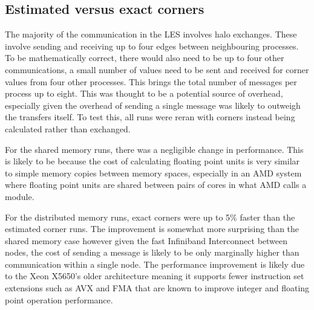 \subsection{Estimated versus exact corners}

The majority of the communication in the LES involves halo exchanges. These
involve sending and receiving up to four edges between neighbouring processes.
To be mathematically correct, there would also need to be up to four other
communications, a small number of values need to be sent and received for corner
values from four other processes. This brings the total number of messages per
process up to eight. This was thought to be a potential source of overhead,
especially given the overhead of sending a single message was likely to outweigh
the transfers itself. To test this, all runs were reran with corners instead
being calculated rather than exchanged.

For the shared memory runs, there was a negligible change in performance. This
is likely to be because the cost of calculating floating point units is very
similar to simple memory copies between memory spaces, especially in an AMD
system where floating point units are shared between pairs of cores in what AMD
calls a module.

For the distributed memory runs, exact corners were up to 5\% faster than the
estimated corner runs. The improvement is somewhat more surprising than the
shared memory case however given the fast Infiniband Interconnect between nodes,
the cost of sending a message is likely to be only marginally higher than
communication within a single node. The performance improvement is likely due to
the Xeon X5650's older architecture meaning it supports fewer instruction set
extensions such as AVX and FMA that are known to improve integer and floating
point operation performance.
